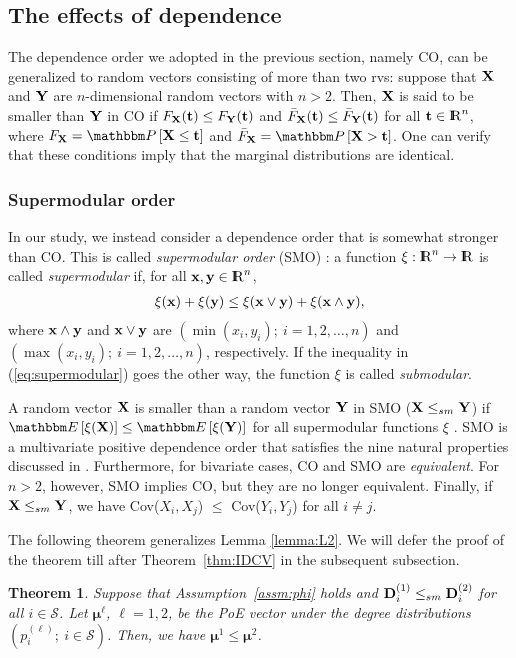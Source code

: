 \documentclass[10pt, journal, compsoc]{IEEEtran}
\newcommand {\cS}{{\mathcal{S}}}
\newcommand {\bX} {{\bf X}}
\newcommand {\bY} {{\bf Y}}
\newcommand {\bt} {{\bf t}}
\newcommand {\bx} {{\bf x}}
\newcommand {\by} {{\bf y}}
\newcommand {\bmu} {\boldsymbol{\mu}}
\newcommand {\R} {{\rm I\kern-2.5pt R}}
\newtheorem{theorem}{Theorem}
\newcommand{\beqa}{\begin{eqnarray}}
\newcommand{\eeqa}{\end{eqnarray}}
\newcommand{\E}[1]{{\mathbbm E}\left[ #1 \right]}
\newcommand{\bP}[1]{{\mathbbm P}\left[ #1 \right]}
\newcommand{\myskip}{\\ \vspace{-0.1in}}
\begin{document}
\subsection{The effects of dependence}

The dependence order we adopted in the
previous section, namely CO, 
can be generalized to random vectors 
consisting of more than two rvs: 
suppose that $\bX$ and $\bY$ are 
$n$-dimensional random vectors with 
$n > 2$. Then, $\bX$ is said to be
smaller than $\bY$ in CO
if $F_{\bX}(\bt) \leq F_{\bY}(\bt)$
and $\bar{F}_{\bX}(\bt) \leq 
\bar{F}_{\bY}(\bt)$ for all $\bt 
\in \R^n$, where $F_{\bX} = \bP{
\bX \leq \bt}$  and $\bar{F}_{\bX}
= \bP{\bX > \bt}$. One can verify
that these conditions imply 
that the marginal distributions 
are identical.

\subsubsection{Supermodular order}

In our study, we instead consider a dependence
order that is somewhat stronger than 
CO. This is called
{\em supermodular order} (SMO)
\cite{MullerStoyan}: a function 
$\xi: \R^n \to \R$ is called {\em 
supermodular}
if, for all $\bx, \by
\in \R^n$, 
\beqa
\xi(\bx) + \xi(\by) \leq
\xi(\bx \vee \by) + \xi(\bx \wedge \by), 
	\label{eq:supermodular}
\eeqa
where $\bx \wedge \by$ and $\bx \vee
\by$ are $(\min(x_i, y_i); \ i = 1, 2,
\ldots, n)$ and $(\max(x_i, y_i); \ i 
= 1, 2, \ldots, n)$, respectively. 
If the inequality in (\ref{eq:supermodular})
goes the other way, the function $\xi$
is called {\em submodular}. 

A random vector $\bX$ is smaller than 
a random vector $\bY$ in SMO 
($\bX \leq_{sm}
\bY$) if $\E{\xi(\bX)} \leq \E{\xi(\bY)}$
for all supermodular functions $\xi$
\cite{MullerStoyan}. SMO is a multivariate
positive dependence order that
satisfies the nine natural properties 
discussed in 
\cite[pp. 110-111]{MullerStoyan}. 
Furthermore, for bivariate cases, 
CO and SMO are {\em equivalent}. 
For $n > 2$, however, SMO implies CO, but 
they are no longer equivalent. Finally, 
if $\bX \leq_{sm} \bY$, we have
Cov($X_i, X_j$) $\leq$ Cov($Y_i, 
Y_j$) for all $i \neq j$. 


The following theorem generalizes Lemma \ref{lemma:L2}. 
We will defer the proof of the theorem till after 
Theorem~\ref{thm:IDCV} in the subsequent subsection.


\begin{theorem}	\label{thm:SM}
Suppose that Assumption~\ref{assm:phi} holds
and ${\bf D}^{(1)}_i \leq_{sm} {\bf D}^{(2)}_i$ for
all $i \in \cS$. Let $\bmu^\ell$, $\ell = 1, 2$,
be the PoE vector under the degree distributions 
$(p^{(\ell)}_i; \ i \in \cS)$. Then, 
we have $\bmu^1 \leq \bmu^2$. 
\myskip
\end{theorem}
\end{document}
